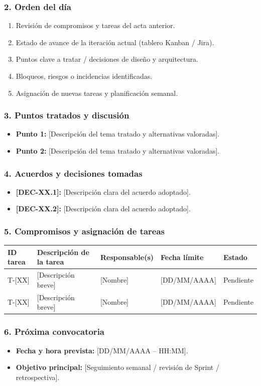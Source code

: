 \subsubsection*{2. Orden del día}
\begin{enumerate}[leftmargin=*]
  \item Revisión de compromisos y tareas del acta anterior.
  \item Estado de avance de la iteración actual (tablero Kanban / Jira).
  \item Puntos clave a tratar / decisiones de diseño y arquitectura.
  \item Bloqueos, riesgos o incidencias identificadas.
  \item Asignación de nuevas tareas y planificación semanal.
\end{enumerate}

\subsubsection*{3. Puntos tratados y discusión}
\begin{itemize}[leftmargin=*]
  \item \textbf{Punto 1:} [Descripción del tema tratado y alternativas valoradas].
  \item \textbf{Punto 2:} [Descripción del tema tratado y alternativas valoradas].
\end{itemize}

\subsubsection*{4. Acuerdos y decisiones tomadas}
\begin{itemize}[leftmargin=*]
  \item \textbf{[DEC-XX.1]:} [Descripción clara del acuerdo adoptado].
  \item \textbf{[DEC-XX.2]:} [Descripción clara del acuerdo adoptado].
\end{itemize}

\subsubsection*{5. Compromisos y asignación de tareas}
\begin{center}
\small
\begin{tabularx}{\textwidth}{|p{1.5cm}|X|p{2.5cm}|p{2.9cm}|p{1.8cm}|}
\hline
\rowcolor{tableHeader}
ID tarea & Descripción de la tarea & Responsable(s) & Fecha límite & Estado \\
\hline
T-[XX] & [Descripción breve] & [Nombre] & [DD/MM/AAAA] & Pendiente \\
\hline
T-[XX] & [Descripción breve] & [Nombre] & [DD/MM/AAAA] & Pendiente \\
\hline
\end{tabularx}
\end{center}

\subsubsection*{6. Próxima convocatoria}
\begin{itemize}[leftmargin=*]
  \item \textbf{Fecha y hora prevista:} [DD/MM/AAAA -- HH:MM].
  \item \textbf{Objetivo principal:} [Seguimiento semanal / revisión de Sprint / retrospectiva].
\end{itemize}